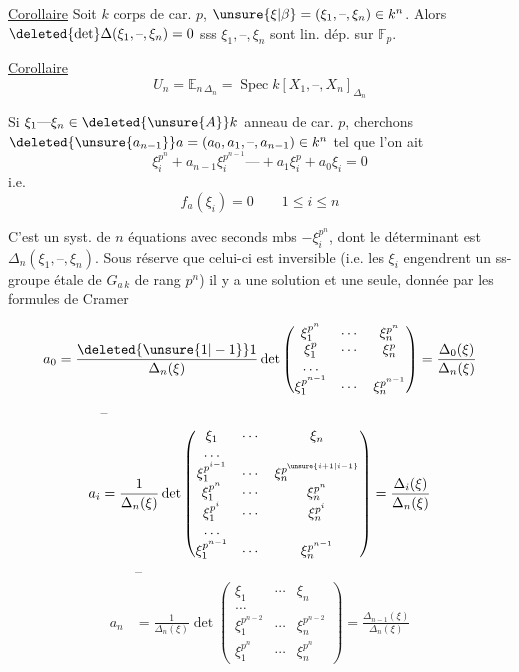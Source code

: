 \uline{Corollaire} Soit $k$ corps de car. $p$, $\unsure{\xi|\beta}=(\xi_1,\text{--},\xi_n)\in k^n$. Alors $\deleted{\det}\Delta(\xi_1,\text{--},\xi_n)=0$ sss $\xi_1,\text{--},\xi_n$ sont lin. dép. sur $\mathbb F_p$.

\uline{Corollaire} \[ U_n=\mathbb E_{n\,\Delta_n}=\operatorname{Spec}k[X_1,\text{--},X_n]_{\Delta_n} \]

Si $\xi_1\text{---}\xi_n\in\deleted{\unsure{A}}k$ anneau de car. $p$, cherchons $\deleted{\unsure{a_{n-1}}}a=(a_0,a_1,\text{--},a_{n-1})\in k^n$ tel que l'on ait
\[ \xi_i^{p^n}+a_{n-1}\xi_i^{p^{n-1}}\text{---}+a_1\xi_i^p+a_0\xi_i=0 \tag*{(*)} \]
i.e.
\[ f_a(\xi_i)=0 \qquad 1\leq i\leq n \]

C'est un syst. de $n$ équations   avec seconds mbs $-\xi_i^{p^n}$, dont le déterminant est $\Delta_n(\xi_1,\text{--},\xi_n)$. Sous réserve que celui-ci est inversible (i.e. les $\xi_i$ engendrent un ss-groupe  étale de $G_{a\,k}$ de rang $p^n$) il y a une solution et une seule, donnée par les formules de Cramer

\[
a_0=\frac{\deleted{\unsure{1|-1}}1}{\Delta_n(\xi)}\det
\begin{pmatrix}\xi_1^{p^n}&\cdots&\xi_n^{p^n}\\\xi_1^p&\cdots&\xi_n^p\\\ldots&&\\\xi_1^{p^{n-1}}&\cdots&\xi_n^{p^{n-1}}\end{pmatrix}
=\frac{\Delta_0(\xi)}{\Delta_n(\xi)}
\]
\[
\begin{aligned}
&\text{--}\\
a_i&=\frac{1}{\Delta_n(\xi)}\det
\begin{pmatrix}
\xi_1&\cdots&\xi_n\\\ldots&&\\
\xi_1^{p^{i-1}}&\cdots&\xi_n^{p^{\unsure{i+1|i-1}}}\\
\xi_1^{p^n}&\cdots&\xi_n^{p^n}\\
\xi_1^{p^{i}}&\cdots&\xi_n^{p^i}\\
\ldots&&\\
\xi_1^{p^{n-1}}&\cdots&\xi_n^{p^{n-1}}
\end{pmatrix}
=\frac{\Delta_i(\xi)}{\Delta_n(\xi)}
\end{aligned}
\]
\[
\begin{aligned}
&\text{--}\\
a_{n}&=\frac{1}{\Delta_n(\xi)}\det
\begin{pmatrix}\xi_1&\cdots&\xi_n\\\ldots&&\\
\xi_1^{p^{n-2}}&\cdots&\xi_n^{p^{n-2}}\\
\xi_1^{p^n}&\cdots&\xi_n^{p^n}\end{pmatrix}
=\frac{\Delta_{n-1}(\xi)}{\Delta_n(\xi)}
\end{aligned}
\]
